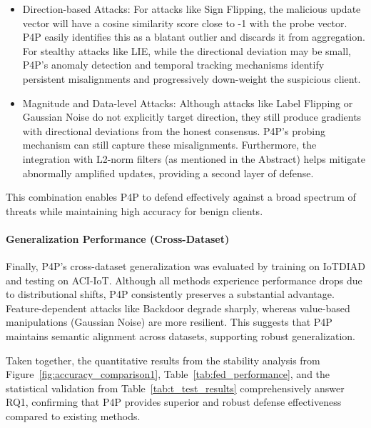 \begin{itemize}
    \item Direction-based Attacks:  For attacks like Sign
    Flipping, the malicious update vector will have a cosine
    similarity score close to -1 with the probe vector. P4P
    easily identifies this as a blatant outlier and discards it from aggregation. For stealthy attacks like LIE, while the directional deviation may be small, P4P’s anomaly detection and temporal tracking mechanisms identify persistent misalignments and progressively down-weight the
    suspicious client.
    \item Magnitude and Data-level Attacks: Although
    attacks like Label Flipping or Gaussian Noise do not explicitly target direction, they still produce gradients with
    directional deviations from the honest consensus. P4P’s
    probing mechanism can still capture these misalignments.
    Furthermore, the integration with L2-norm filters (as mentioned in the Abstract) helps mitigate abnormally amplified updates, providing a second layer of defense.
\end{itemize}

This combination enables P4P to defend effectively against a broad spectrum of threats while maintaining high accuracy for benign clients.

\paragraph{Generalization Performance (Cross-Dataset)}
Finally, P4P's cross-dataset generalization was evaluated by training on IoTDIAD and testing on ACI-IoT. Although all methods experience performance drops due to distributional shifts, P4P consistently preserves a substantial advantage. Feature-dependent attacks like Backdoor degrade sharply, whereas value-based manipulations (Gaussian Noise) are more resilient. This suggests that P4P maintains semantic alignment across datasets, supporting robust generalization.

Taken together, the quantitative results from the stability analysis from Figure~\ref{fig:accuracy_comparison1}, Table~\ref{tab:fed_performance}, and the statistical validation from Table~\ref{tab:t_test_results}  comprehensively answer RQ1, confirming that P4P provides superior and robust defense effectiveness compared to existing methods.
